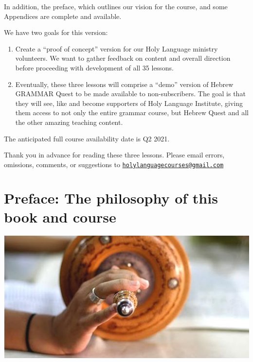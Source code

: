 \documentclass[
]{turabian-researchpaper}
\providecommand{\tightlist}{%
  \setlength{\itemsep}{0pt}\setlength{\parskip}{0pt}}
\begin{document}
In addition, the preface, which outlines our vision for the course, and some Appendices are complete and available.

We have two goals for this version:

\begin{enumerate}
\def\labelenumi{\arabic{enumi}.}
\tightlist
\item
  Create a ``proof of concept'' version for our Holy Language ministry volunteers. We want to gather feedback on content and overall direction before proceeding with development of all 35 lessons.
\item
  Eventually, these three lessons will comprise a ``demo'' version of Hebrew GRAMMAR Quest to be made available to non-subscribers. The goal is that they will see, like and become supporters of Holy Language Institute, giving them access to not only the entire grammar course, but Hebrew Quest and all the other amazing teaching content.
\end{enumerate}

The anticipated full course availability date is Q2 2021.

Thank you in advance for reading these three lessons. Please email errors, omissions, comments, or suggestions to \href{mailto:holylanguagecourses@gmail.com}{\nolinkurl{holylanguagecourses@gmail.com}}

\hypertarget{preface}{%
\section*{Preface: The philosophy of this book and course}\label{preface}}

\begin{center}\includegraphics[width=500pt]{images/torah_scroll} \end{center}
\end{document}
